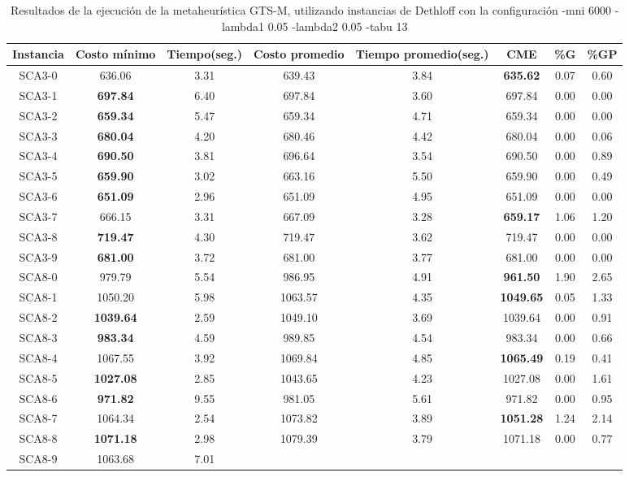 \begin{table}[h]
\caption{Resultados de la ejecución de la metaheurística GTS-M, utilizando instancias de Dethloff con la configuración -mni 6000 -lambda1 0.05 -lambda2 0.05 -tabu 13}
\centering
\small
\begin{tabular}{c c c c c c c c}
\hline\hline
Instancia & Costo mínimo & Tiempo(seg.) & Costo promedio & Tiempo promedio(seg.) & CME & \%G & \%GP \\ [0.5ex]
\hline
SCA3-0 & 636.06 & 3.31 & 
639.43 & 3.84 & \bf{635.62} & 
0.07 & 0.60\\SCA3-1 & \bf{697.84} & 6.40 & 
697.84 & 3.60 & 697.84 & 0.00
 & 0.00\\
SCA3-2 & \bf{659.34} & 5.47 & 
659.34 & 4.71 & 659.34 & 0.00
 & 0.00\\
SCA3-3 & \bf{680.04} & 4.20 & 
680.46 & 4.42 & 680.04 & 0.00
 & 0.06\\SCA3-4 & \bf{690.50} & 3.81 & 
696.64 & 3.54 & 690.50 & 0.00
 & 0.89\\SCA3-5 & \bf{659.90} & 3.02 & 
663.16 & 5.50 & 659.90 & 0.00
 & 0.49\\SCA3-6 & \bf{651.09} & 2.96 & 
651.09 & 4.95 & 651.09 & 0.00
 & 0.00\\
SCA3-7 & 666.15 & 3.31 & 
667.09 & 3.28 & \bf{659.17} & 
1.06 & 1.20\\SCA3-8 & \bf{719.47} & 4.30 & 
719.47 & 3.62 & 719.47 & 0.00
 & 0.00\\
SCA3-9 & \bf{681.00} & 3.72 & 
681.00 & 3.77 & 681.00 & 0.00
 & 0.00\\
SCA8-0 & 979.79 & 5.54 & 
986.95 & 4.91 & \bf{961.50} & 
1.90 & 2.65\\SCA8-1 & 1050.20 & 5.98 & 
1063.57 & 4.35 & \bf{1049.65} & 
0.05 & 1.33\\SCA8-2 & \bf{1039.64} & 2.59 & 
1049.10 & 3.69 & 1039.64 & 0.00
 & 0.91\\SCA8-3 & \bf{983.34} & 4.59 & 
989.85 & 4.54 & 983.34 & 0.00
 & 0.66\\SCA8-4 & 1067.55 & 3.92 & 
1069.84 & 4.85 & \bf{1065.49} & 
0.19 & 0.41\\SCA8-5 & \bf{1027.08} & 2.85 & 
1043.65 & 4.23 & 1027.08 & 0.00
 & 1.61\\SCA8-6 & \bf{971.82} & 9.55 & 
981.05 & 5.61 & 971.82 & 0.00
 & 0.95\\SCA8-7 & 1064.34 & 2.54 & 
1073.82 & 3.89 & \bf{1051.28} & 
1.24 & 2.14\\SCA8-8 & \bf{1071.18} & 2.98 & 
1079.39 & 3.79 & 1071.18 & 0.00
 & 0.77\\SCA8-9 & 1063.68 & 7.01 & 

\end{tabular}
\end{table}
